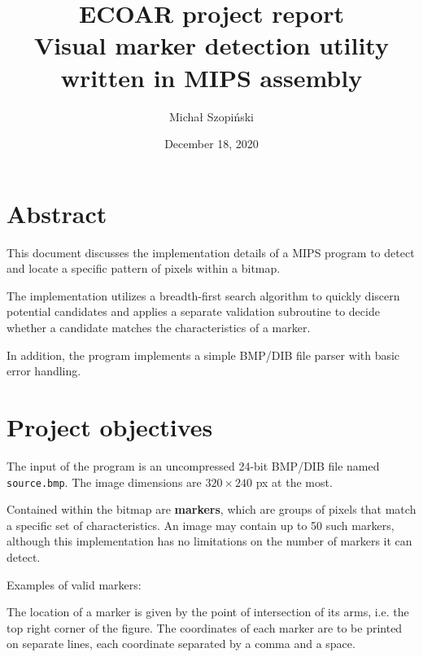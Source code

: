 \documentclass{article}
\begin{document}
	\title{ECOAR project report\\Visual marker detection utility
	\\written in MIPS assembly}
	\author{Michał Szopiński}
	\date{December 18, 2020}
	\maketitle
	
	\setcounter{section}{-1}
	\section{Abstract}
	
	This document discusses the implementation details of a MIPS program to
	detect and locate a specific pattern of pixels within a bitmap.
	
	The implementation utilizes a breadth-first search algorithm to quickly
	discern potential candidates and applies a separate validation subroutine to
	decide whether a candidate matches the characteristics of a marker.
	
	In addition, the program implements a simple BMP/DIB file parser with basic
	error handling.
	
	\newpage
	\renewcommand{\baselinestretch}{0}\normalsize
	\tableofcontents
	\renewcommand{\baselinestretch}{1}\normalsize
	
	\newpage
	\section{Project objectives}
	
	The input of the program is an uncompressed 24-bit BMP/DIB file named
	\texttt{source.bmp}. The image dimensions are $320\times240$ px at the most.
	
	Contained within the bitmap are \textbf{markers}, which are groups of pixels
	that match a specific set of characteristics. An image may contain up to 50
	such markers, although this implementation has no limitations on the number
	of markers it can detect.
	
	Examples of valid markers:
	
	\begin{center}
	\end{center}
	
	The location of a marker is given by the point of intersection of its arms,
	i.e. the top right corner of the figure. The coordinates of each marker
	are to be printed on separate lines, each coordinate separated by a comma
	and a space.
	
\end{document}
